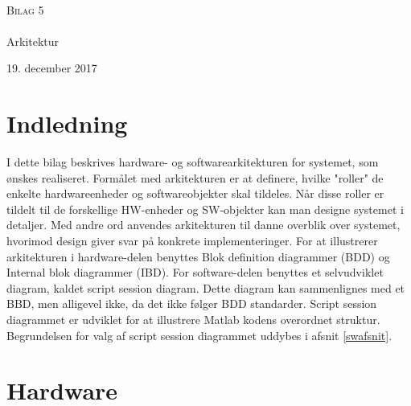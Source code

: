 

\begin{titlingpage}
\begin{center}

~ \\[3cm]


\textsc{\LARGE Bilag 5}\\[1.5cm]


\noindent\makebox[\linewidth]{\rule{\textwidth}{0.4pt}}\\
[0.5cm]{\Huge Arkitektur}
\noindent\makebox[\linewidth]{\rule{\textwidth}{0.4pt}}
\end{center}
\vfill
\begin{center}
{\large 19. december 2017}
\end{center}
\end{titlingpage}

\newpage
\tableofcontents*
\newpage

\chapter{Indledning}

I dette bilag beskrives hardware- og softwarearkitekturen for systemet, som ønskes realiseret. Formålet med arkitekturen er at definere, hvilke "roller" de enkelte hardwareenheder og softwareobjekter skal tildeles. Når disse roller er tildelt til de forskellige HW-enheder og SW-objekter kan man designe systemet i detaljer. Med andre ord anvendes arkitekturen til danne overblik over systemet, hvorimod design giver svar på konkrete implementeringer. For at illustrerer arkitekturen i hardware-delen benyttes Blok definition diagrammer (BDD) og Internal blok diagrammer (IBD). For software-delen benyttes et selvudviklet diagram, kaldet script session diagram. Dette diagram kan sammenlignes med et BBD, men alligevel ikke, da det ikke følger BDD standarder. Script session diagrammet er udviklet for at illustrere Matlab kodens overordnet struktur. Begrundelsen for valg af script session diagrammet uddybes i afsnit \ref{swafsnit}.         


\citep{Aroom2009}


\chapter{Hardware}
